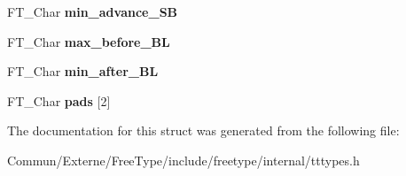\begin{DoxyCompactItemize}
\item 
F\+T\+\_\+\+Char {\bfseries min\+\_\+advance\+\_\+\+SB}\hypertarget{struct_t_t___s_bit___line_metrics_rec___ad4f4578a99ce4537bd454bf47a60074c}{}\label{struct_t_t___s_bit___line_metrics_rec___ad4f4578a99ce4537bd454bf47a60074c}

\item 
F\+T\+\_\+\+Char {\bfseries max\+\_\+before\+\_\+\+BL}\hypertarget{struct_t_t___s_bit___line_metrics_rec___a63599b9adfc64d1927b6a8b46d9ce08d}{}\label{struct_t_t___s_bit___line_metrics_rec___a63599b9adfc64d1927b6a8b46d9ce08d}

\item 
F\+T\+\_\+\+Char {\bfseries min\+\_\+after\+\_\+\+BL}\hypertarget{struct_t_t___s_bit___line_metrics_rec___a553dfe17d98fd138430545f4f77195c5}{}\label{struct_t_t___s_bit___line_metrics_rec___a553dfe17d98fd138430545f4f77195c5}

\item 
F\+T\+\_\+\+Char {\bfseries pads} \mbox{[}2\mbox{]}\hypertarget{struct_t_t___s_bit___line_metrics_rec___a9f98e5de39f252b6ebfb3e94120d1dbc}{}\label{struct_t_t___s_bit___line_metrics_rec___a9f98e5de39f252b6ebfb3e94120d1dbc}

\end{DoxyCompactItemize}


The documentation for this struct was generated from the following file\+:\begin{DoxyCompactItemize}
\item 
Commun/\+Externe/\+Free\+Type/include/freetype/internal/tttypes.\+h\end{DoxyCompactItemize}
